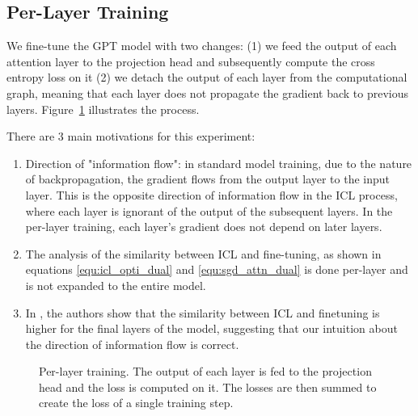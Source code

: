 \documentclass[11pt]{article}
\begin{document}
\subsection{Per-Layer Training}
We fine-tune the GPT model with two changes: (1) we feed the output of each attention layer to the projection head and subsequently compute the cross entropy loss on it
(2) we detach the output of each layer from the computational graph, meaning that each layer does not propagate the gradient back to previous layers. Figure~\ref{per-layer-training} illustrates the process.

There are 3 main motivations for this experiment:
\begin{enumerate}
	\item Direction of "information flow": in standard model training, due to the nature of backpropagation, the gradient flows from the output layer to the input layer.
	      This is the opposite direction of information flow in the ICL process, where each layer is ignorant of the output of the subsequent layers.
	      In the per-layer training, each layer's gradient does not depend on later layers.
	\item The analysis of the similarity between ICL and fine-tuning, as shown in equations \ref{equ:icl_opti_dual} and \ref{equ:sgd_attn_dual} is done per-layer and is not expanded to the entire model.
	\item In \cite{dai2023gpt}, the authors show that the similarity between ICL and finetuning is higher for the final layers of the model, suggesting that our intuition about the direction of information flow is correct.
\end{enumerate}

\begin{figure}%
	\centering
	\caption{Per-layer training. The output of each layer is fed to the projection head and the loss is computed on it. The losses are then summed to create the loss of a single training step.}
	\label{per-layer-training}
\end{figure}
\end{document}
